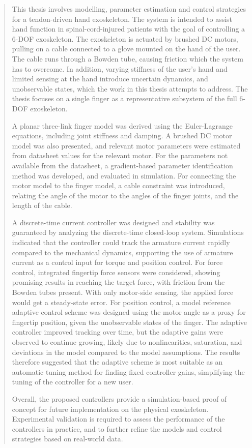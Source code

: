 \begin{abstract}
This thesis involves modelling, parameter estimation and control strategies for a tendon-driven hand exoskeleton. The system is intended to assist hand function in spinal-cord-injured patients with the goal of controlling a \mbox{6-DOF} exoskeleton. The exoskeleton is actuated by brushed DC motors, pulling on a cable connected to a glove mounted on the hand of the user. The cable runs through a Bowden tube, causing friction which the system has to overcome. In addition, varying stiffness of the user's hand and limited sensing at the hand introduce uncertain dynamics, and unobservable states, which the work in this thesis attempts to address. The thesis focuses on a single finger as a representative subsystem of the full 6-DOF exoskeleton.

A planar three-link finger model was derived using the Euler-Lagrange equations, including joint stiffness and damping. A brushed DC motor model was also presented, and relevant motor parameters were estimated from datasheet values for the relevant motor. For the parameters not available from the datasheet, a gradient-based parameter identification method was developed, and evaluated in simulation. For connecting the motor model to the finger model, a cable constraint was introduced, relating the angle of the motor to the angles of the finger joints, and the length of the cable.

A discrete-time current controller was designed and stability was guaranteed by analyzing the discrete-time closed-loop system. Simulations indicated that the controller could track the armature current rapidly compared to the mechanical dynamics, supporting the use of armature current as a control input for torque and position control. For force control, integrated fingertip force sensors were considered, showing promising results in reaching the target force, with friction from the Bowden tubes present. With only motor-side sensing, the applied force would get a steady-state error. For position control, a model reference adaptive control scheme was designed using the motor angle as a proxy for fingertip position, given the unobservable states of the finger. The adaptive controller improved tracking over time, but the adaptive gains were observed to continue growing, likely due to nonlinearities, saturation, and deviations in the model compared to the model assumptions. The results therefore suggested that the adaptive scheme is most suitable as an automatic tuning method for finding fixed controller gains, simplifying the tuning of the controller for a new user.

Overall, the proposed controllers provide a simulation-based proof of concept for future implementation on the physical exoskeleton. Experimental validation is required to assess the performance of the controllers in practice, and to further refine the models and control strategies based on real-world data. 
\end{abstract} 